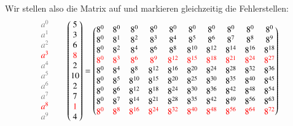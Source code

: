 Wir stellen also die Matrix auf und markieren gleichzeitig die Fehlerstellen:
\[
\textcolor{gray}{
	\begin{matrix}
		a^0 \\ a^1 \\ a^2 \\ \textcolor{red}{a^3} \\ a^4 \\ a^5 \\ a^6 \\ a^7 \\ \textcolor{red}{a^8} \\ a^9 \\
\end{matrix}}
\qquad
\begin{pmatrix}
	5 \\ 3 \\ 6 \\ \textcolor{red}{8} \\ 2 \\ 10 \\ 2 \\ 7 \\ \textcolor{red}{1} \\ 4 \\
\end{pmatrix}
=
\begin{pmatrix}
	8^0&    8^0&    8^0&    8^0&    8^0&    8^0&    8^0&    8^0&    8^0&    8^0\\
	8^0&	8^1&	8^2&	8^3&	8^4&	8^5&	8^6&	8^7&    8^8&	8^9\\
	8^0&	8^2&	8^4&	8^6&	8^8& 8^{10}& 8^{12}& 8^{14}& 8^{16}& 8^{18}\\
	\textcolor{red}{8^0}&	\textcolor{red}{8^3}&	\textcolor{red}{8^6}&	\textcolor{red}{8^9}& \textcolor{red}{8^{12}}& \textcolor{red}{8^{15}}& \textcolor{red}{8^{18}}& \textcolor{red}{8^{21}}& \textcolor{red}{8^{24}}& \textcolor{red}{8^{27}}\\
	8^0&	8^4&	8^8& 8^{12}& 8^{16}& 8^{20}& 8^{24}& 8^{28}& 8^{32}& 8^{36}\\
	8^0&	8^5& 8^{10}& 8^{15}& 8^{20}& 8^{25}& 8^{30}& 8^{35}& 8^{40}& 8^{45}\\
	8^0&	8^6& 8^{12}& 8^{18}& 8^{24}& 8^{30}& 8^{36}& 8^{42}& 8^{48}& 8^{54}\\
	8^0&	8^7& 8^{14}& 8^{21}& 8^{28}& 8^{35}& 8^{42}& 8^{49}& 8^{56}& 8^{63}\\
	\textcolor{red}{8^0}&	\textcolor{red}{8^8}& \textcolor{red}{8^{16}}& \textcolor{red}{8^{24}}& \textcolor{red}{8^{32}}& \textcolor{red}{8^{40}}& \textcolor{red}{8^{48}}& \textcolor{red}{8^{56}}& \textcolor{red}{8^{64}}& \textcolor{red}{8^{72}}\\

\end{pmatrix}\]
